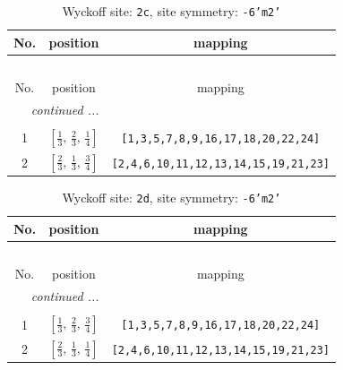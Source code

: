 \documentclass[fleqn,8pt]{jsarticle}
\begin{document}
\renewcommand{\arraystretch}{1.2}
\begin{longtable}{ccc}
\caption{Wyckoff site: {\tt 2c}, site symmetry: {\tt -6'm2'}}
 \\
 \hline \hline
No. & position & mapping \\ \hline \endfirsthead

\multicolumn{2}{l}{\tablename\ \thetable{}} \\
 \hline \hline
No. & position & mapping \\ \hline \endhead

 \hline \hline
\multicolumn{2}{r}{\footnotesize\it continued ...} \\ \endfoot

 \hline \hline
\multicolumn{2}{r}{} \\ \endlastfoot

1 & $\left[ \frac{1}{3},\, \frac{2}{3},\, \frac{1}{4} \right]$ & {\tt [1,3,5,7,8,9,16,17,18,20,22,24]} \\ \hline
2 & $\left[ \frac{2}{3},\, \frac{1}{3},\, \frac{3}{4} \right]$ & {\tt [2,4,6,10,11,12,13,14,15,19,21,23]} \\
\end{longtable}
\renewcommand{\arraystretch}{1.2}
\begin{longtable}{ccc}
\caption{Wyckoff site: {\tt 2d}, site symmetry: {\tt -6'm2'}}
 \\
 \hline \hline
No. & position & mapping \\ \hline \endfirsthead

\multicolumn{2}{l}{\tablename\ \thetable{}} \\
 \hline \hline
No. & position & mapping \\ \hline \endhead

 \hline \hline
\multicolumn{2}{r}{\footnotesize\it continued ...} \\ \endfoot

 \hline \hline
\multicolumn{2}{r}{} \\ \endlastfoot

1 & $\left[ \frac{1}{3},\, \frac{2}{3},\, \frac{3}{4} \right]$ & {\tt [1,3,5,7,8,9,16,17,18,20,22,24]} \\ \hline
2 & $\left[ \frac{2}{3},\, \frac{1}{3},\, \frac{1}{4} \right]$ & {\tt [2,4,6,10,11,12,13,14,15,19,21,23]} \\
\end{longtable}
\renewcommand{\arraystretch}{1.2}
\end{document}
